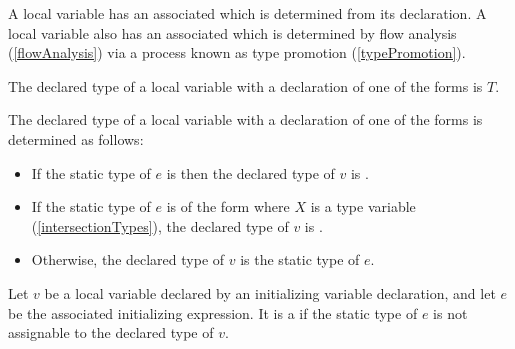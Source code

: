 \documentclass[makeidx]{article}
\begin{document}
{\LMHash{}%
A local variable has an associated
which is determined from its declaration.
A local variable also has an associated
which is determined by flow analysis
(\ref{flowAnalysis})
via a process known as type promotion
(\ref{typePromotion}).

\LMHash{}%
The declared type of a local variable with a declaration of one of the forms
is $T$.

\LMHash{}%
The declared type of a local variable with a declaration of one of the forms
is determined as follows:

\begin{itemize}
\item
  If the static type of $e$ is  then
  the declared type of $v$ is \DYNAMIC.
\item
  If the static type of $e$ is of the form 
  where $X$ is a type variable
  (\ref{intersectionTypes}),
  the declared type of $v$ is .
\item
  Otherwise, the declared type of $v$ is the static type of $e$.
\end{itemize}

\LMHash{}%
Let $v$ be a local variable declared by an initializing variable declaration,
and let $e$ be the associated initializing expression.
It is a
 if the static type of $e$ is not assignable to
the declared type of $v$.


}
\end{document}
